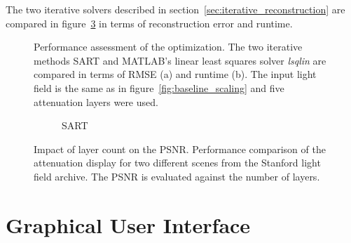 The two iterative solvers described in section~\ref{sec:iterative_reconstruction} are compared in figure~\ref{fig:sart_vs_lsqlin} in terms of reconstruction error and runtime.
\begin{figure}[tb]
	\begin{subfigure}{0.5\textwidth}
		\centering
		
		\caption{}
		\label{fig:sart_lsqlin_iterations_vs_rmse}
	\end{subfigure}%
	\begin{subfigure}{0.5\textwidth}
		\centering
		
		\caption{}
		\label{fig:sart_lsqlin_iterations_vs_time}
	\end{subfigure}%
	\caption[Performance assessment of the optimization]
			{Performance assessment of the optimization.
			 The two iterative methods \mbox{SART} and \mbox{MATLAB's} linear least squares solver \emph{lsqlin} are compared in terms of \mbox{RMSE} (a) and runtime (b).
			 The input light field is the same as in figure~\ref{fig:baseline_scaling} and five attenuation layers were used.}
	\label{fig:sart_vs_lsqlin}
\end{figure}

\begin{figure}[tb]
	\begin{subfigure}{\textwidth}
		\centering
		
		\caption{SART}
		\label{fig:sart_layers_vs_psnr}
	\end{subfigure}%
	\caption[Impact of layer count on \mbox{PSNR}]
			{Impact of layer count on the \mbox{PSNR}.
			 Performance comparison of the attenuation display for two different scenes from the Stanford light field archive.
			 The \mbox{PSNR} is evaluated against the number of layers.}
\end{figure}

\section{Graphical User Interface}
\label{sec:GUI}

